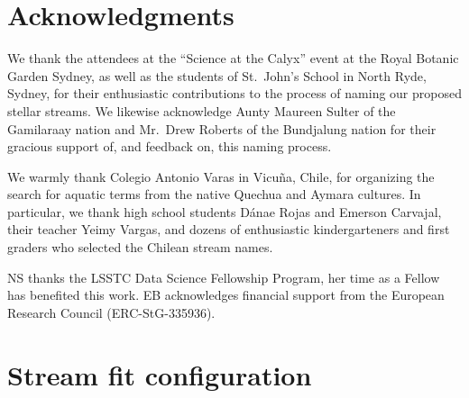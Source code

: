 \documentclass[twocolumn]{aastex61}
\begin{document}
\section*{Acknowledgments}

We thank the attendees at the ``Science at the Calyx'' event at the Royal Botanic Garden Sydney, as well as the students of St.\ John's School in North Ryde, Sydney, for their enthusiastic contributions to the process of naming our proposed stellar streams.  
We likewise acknowledge Aunty Maureen Sulter of the Gamilaraay nation and Mr.\ Drew Roberts of the Bundjalung nation for their gracious support of, and feedback on, this naming process.

We warmly thank Colegio Antonio Varas in Vicu\~{n}a, Chile, for organizing the search for aquatic terms from the native Quechua and Aymara cultures. In particular, we thank high school students D\'{a}nae Rojas and Emerson Carvajal, their teacher Yeimy Vargas, and dozens of enthusiastic kindergarteners and first graders who selected the Chilean stream names.

NS thanks the LSSTC Data Science Fellowship Program, her time as a Fellow has benefited this work.
EB acknowledges financial support from the European Research Council (ERC-StG-335936).




\clearpage

\appendix
{}

\section{Stream fit configuration}
\label{app:fit}
\end{document}
